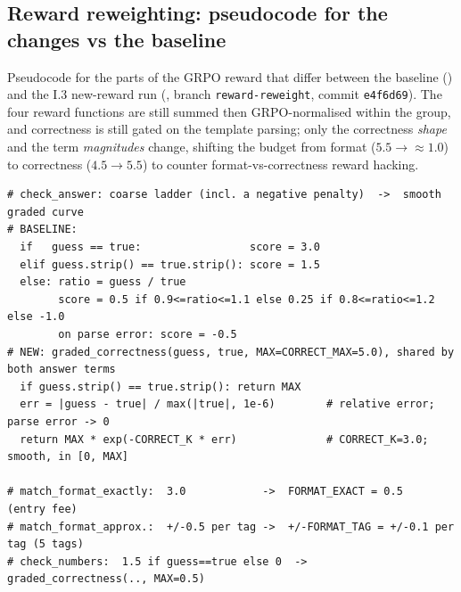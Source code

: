 \subsection{Reward reweighting: pseudocode for the changes vs the baseline}
\label{app:reward}

Pseudocode for the parts of the GRPO reward that differ between the baseline
() and the I.3 new-reward run
(, branch \texttt{reward-reweight}, commit \texttt{e4f6d69}).
The four reward functions are still summed then GRPO-normalised within the group, and
correctness is still gated on the template parsing; only the correctness \emph{shape}
and the term \emph{magnitudes} change, shifting the budget from format ($5.5\to\approx1.0$)
to correctness ($4.5\to5.5$) to counter format-vs-correctness reward hacking.

\begin{verbatim}
# check_answer: coarse ladder (incl. a negative penalty)  ->  smooth graded curve
# BASELINE:
  if   guess == true:                 score = 3.0
  elif guess.strip() == true.strip(): score = 1.5
  else: ratio = guess / true
        score = 0.5 if 0.9<=ratio<=1.1 else 0.25 if 0.8<=ratio<=1.2 else -1.0
        on parse error: score = -0.5
# NEW: graded_correctness(guess, true, MAX=CORRECT_MAX=5.0), shared by both answer terms
  if guess.strip() == true.strip(): return MAX
  err = |guess - true| / max(|true|, 1e-6)        # relative error; parse error -> 0
  return MAX * exp(-CORRECT_K * err)              # CORRECT_K=3.0; smooth, in [0, MAX]

# match_format_exactly:  3.0            ->  FORMAT_EXACT = 0.5   (entry fee)
# match_format_approx.:  +/-0.5 per tag ->  +/-FORMAT_TAG = +/-0.1 per tag (5 tags)
# check_numbers:  1.5 if guess==true else 0  ->  graded_correctness(.., MAX=0.5)
\end{verbatim}
